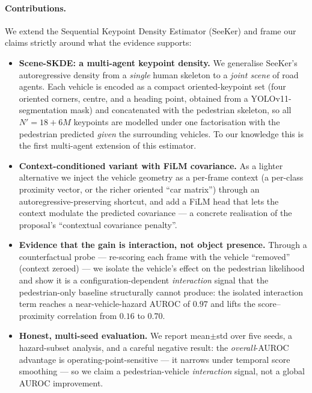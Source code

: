 \paragraph{Contributions.}
We extend the Sequential Keypoint Density Estimator (SeeKer) and frame our claims
strictly around what the evidence supports:
\begin{itemize}
  \item \textbf{Scene-SKDE: a multi-agent keypoint density.} We generalise
  SeeKer's autoregressive density from a \emph{single} human skeleton to a
  \emph{joint scene} of road agents. Each vehicle is encoded as a compact
  oriented-keypoint set (four oriented corners, centre, and a heading point,
  obtained from a YOLOv11-segmentation mask) and concatenated with the pedestrian
  skeleton, so all $N'{=}18{+}6M$ keypoints are modelled under one factorisation
  with the pedestrian predicted \emph{given} the surrounding vehicles. To our
  knowledge this is the first multi-agent extension of this estimator.
  \item \textbf{Context-conditioned variant with FiLM covariance.} As a lighter
  alternative we inject the vehicle geometry as a per-frame context (a per-class
  proximity vector, or the richer oriented ``car matrix'') through an
  autoregressive-preserving shortcut, and add a FiLM head that lets the context
  modulate the predicted covariance --- a concrete realisation of the proposal's
  ``contextual covariance penalty''.
  \item \textbf{Evidence that the gain is interaction, not object presence.}
  Through a counterfactual probe --- re-scoring each frame with the vehicle
  ``removed'' (context zeroed) --- we isolate the vehicle's effect on the
  pedestrian likelihood and show it is a configuration-dependent
  \emph{interaction} signal that the pedestrian-only baseline structurally cannot
  produce: the isolated interaction term reaches a near-vehicle-hazard AUROC of
  $0.97$ and lifts the score--proximity correlation from $0.16$ to $0.70$.
  \item \textbf{Honest, multi-seed evaluation.} We report mean$\pm$std over five
  seeds, a hazard-subset analysis, and a careful negative result: the
  \emph{overall}-AUROC advantage is operating-point-sensitive --- it narrows
  under temporal score smoothing --- so we claim a pedestrian-vehicle
  \emph{interaction} signal, not a global AUROC improvement.
\end{itemize}

